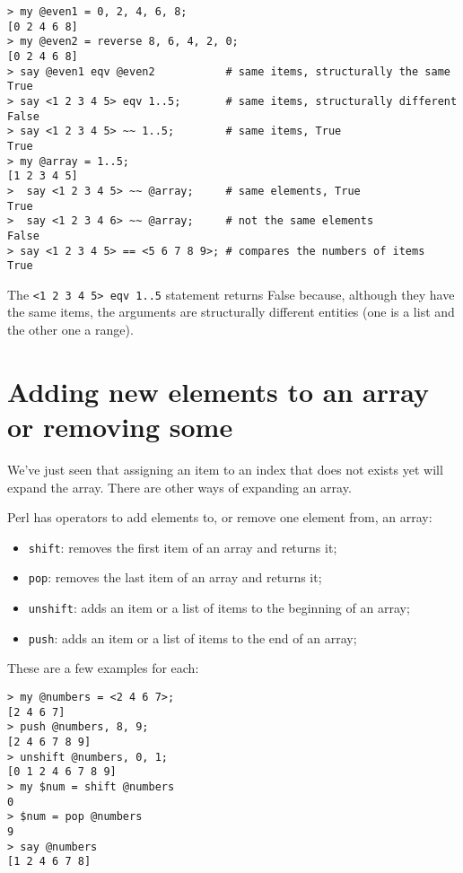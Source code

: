 \begin{verbatim}
> my @even1 = 0, 2, 4, 6, 8;
[0 2 4 6 8]
> my @even2 = reverse 8, 6, 4, 2, 0;
[0 2 4 6 8]
> say @even1 eqv @even2           # same items, structurally the same
True
> say <1 2 3 4 5> eqv 1..5;       # same items, structurally different
False
> say <1 2 3 4 5> ~~ 1..5;        # same items, True
True
> my @array = 1..5;               
[1 2 3 4 5]
>  say <1 2 3 4 5> ~~ @array;     # same elements, True
True
>  say <1 2 3 4 6> ~~ @array;     # not the same elements
False
> say <1 2 3 4 5> == <5 6 7 8 9>; # compares the numbers of items
True
\end{verbatim}

The \verb'<1 2 3 4 5> eqv 1..5' statement returns False because, 
although they have the same items, the arguments are structurally 
different entities (one is a list and the other one a range).

\section{Adding new elements to an array or removing some}

We've just seen that assigning an item to an index that does 
not exists yet will expand the array. There are other 
ways of expanding an array.

Perl has operators to add elements to, or remove one element 
from, an array:

\begin{itemize}
\item {\tt shift}: removes the first item of an array and returns it;
\item {\tt pop}: removes the last item of an array and returns it;
\item {\tt unshift}: adds an item or a list of items to the 
beginning of an array;
\item {\tt push}: adds an item or a list of items to the 
end of an array;
\end{itemize}

These are a few examples for each:

\begin{verbatim}
> my @numbers = <2 4 6 7>;
[2 4 6 7]
> push @numbers, 8, 9;
[2 4 6 7 8 9]
> unshift @numbers, 0, 1;
[0 1 2 4 6 7 8 9]
> my $num = shift @numbers
0
> $num = pop @numbers
9
> say @numbers
[1 2 4 6 7 8]
\end{verbatim}

